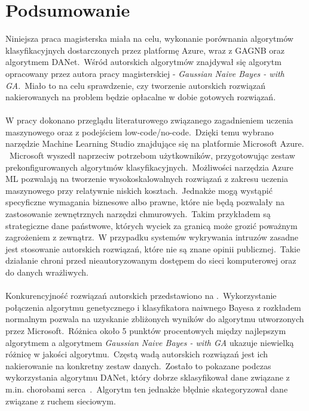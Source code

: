 \chapter{Podsumowanie}
Niniejsza praca magisterska miała na celu, wykonanie porównania algorytmów klasyfikacyjnych dostarczonych przez platformę Azure, wraz z GAGNB oraz algorytmem DANet.\ Wśród autorskich algorytmów znajdywał się algorytm opracowany przez autora pracy magisterskiej - \textit{Gaussian Naive Bayes - with GA}.\ Miało to na celu sprawdzenie, czy tworzenie autorskich rozwiązań nakierowanych na problem będzie opłacalne w dobie gotowych rozwiązań.
\\ \\
W pracy dokonano przeglądu literaturowego związanego zagadnieniem uczenia maszynowego oraz z podejściem low-code/no-code.\ Dzięki temu wybrano narzędzie Machine Learning Studio znajdujące się na platformie Microsoft Azure. \ Microsoft wyszedł naprzeciw potrzebom użytkowników, przygotowując zestaw prekonfigurowanych algorytmów klasyfikacyjnych.\ Możliwości narzędzia Azure ML pozwalają na tworzenie wysokoskalowalnych rozwiązań z zakresu uczenia maszynowego przy relatywnie niskich kosztach.\ Jednakże mogą wystąpić specyficzne wymagania biznesowe albo prawne, które nie będą pozwalały na zastosowanie zewnętrznych narzędzi chmurowych.\ Takim przykładem są strategiczne dane państwowe, których wyciek za granicą może grozić poważnym zagrożeniem z zewnątrz.\ W przypadku systemów wykrywania intruzów zasadne jest stosowanie autorskich rozwiązań, które nie są znane opinii publicznej.\ Takie działanie chroni przed nieautoryzowanym dostępem do sieci komputerowej oraz do danych wrażliwych.
\\ \\
Konkurencyjność rozwiązań autorskich przedstawiono na .\ Wykorzystanie połączenia algorytmu genetycznego i klasyfikatora naiwnego Bayesa z rozkładem normalnym pozwala na uzyskanie zbliżonych wyników do algorytmu utworzonych przez Microsoft.\ Różnica około 5 punktów procentowych między najlepszym algorytmem a algorytmem \textit{Gaussian Naive Bayes - with GA} ukazuje niewielką różnicę w jakości algorytmu.\ Częstą wadą autorskich rozwiązań jest ich nakierowanie na konkretny zestaw danych.\ Zostało to pokazane podczas wykorzystania algorytmu DANet, który dobrze sklasyfikował dane związane z m.in. chorobami serca~\cite{Chen2022}.\ Algorytm ten jednakże błędnie skategoryzował dane związane z ruchem sieciowym.
\\ \\
